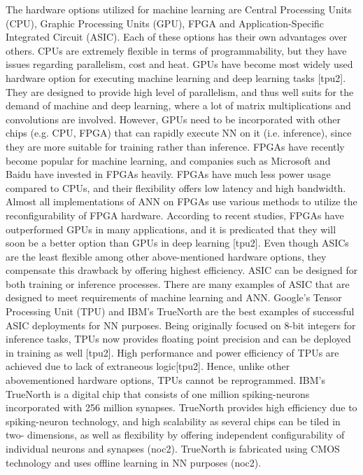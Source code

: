 The hardware options utilized for machine learning are Central Processing Units (CPU), Graphic
Processing Units (GPU), FPGA and Application-Specific Integrated Circuit (ASIC). 
Each of these options has their own advantages over others. CPUs are extremely flexible in terms of programmability, but they have issues regarding parallelism, cost and heat. 
GPUs have become most widely used hardware option for executing machine learning and deep learning tasks [tpu2]. They are designed to provide high level of parallelism, and thus well suits for the demand of machine and deep learning, where a lot of
matrix multiplications and convolutions are involved.
However, GPUs need to be incorporated with other
chips (e.g. CPU, FPGA) that can rapidly execute NN on it (i.e. inference), since they are more suitable for
training rather than inference. 
FPGAs have recently become popular for machine learning, and companies such as Microsoft and Baidu have invested in FPGAs heavily. 
FPGAs have much less power usage compared to CPUs, and their flexibility offers low latency and high bandwidth. Almost all implementations of ANN on FPGAs use various methods to utilize the reconfigurability of FPGA
hardware. 
According to recent studies, FPGAs have outperformed GPUs in many applications, and it is predicated that they will soon be a better option than GPUs in deep learning [tpu2]. Even though ASICs are the least flexible among other above-mentioned hardware options, they compensate this drawback by offering highest efficiency. ASIC can be designed for both training or inference processes.
There are many examples of ASIC that are designed to meet requirements of machine learning and ANN.
Google’s Tensor Processing Unit (TPU) and IBM’s TrueNorth are the best examples of successful ASIC
deployments for NN purposes. Being originally focused on 8-bit integers for inference tasks, TPUs now
provides floating point precision and can be deployed in training as well [tpu2]. High performance and
power efficiency of TPUs are achieved due to lack of extraneous logic[tpu2]. Hence, unlike other
abovementioned hardware options, TPUs cannot be reprogrammed. IBM’s TrueNorth is a digital chip that
consists of one million spiking-neurons incorporated with 256 million synapses. TrueNorth provides high
efficiency due to spiking-neuron technology, and high scalability as several chips can be tiled in two-
dimensions, as well as flexibility by offering independent configurability of individual neurons and
synapses (noc2). TrueNorth is fabricated using CMOS technology and uses offline learning in NN
purposes (noc2).
   

